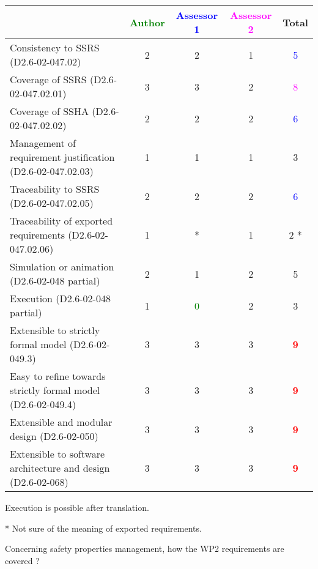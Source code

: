 \begin{tabular}{|l | c | c | c | c|}
\hline
& \textcolor{green}{Author} & \textcolor{blue}{Assessor 1} & \textcolor{magenta}{Assessor 2} & Total \\
\hline 
Consistency to SSRS (D2.6-02-047.02) & 2    & 2    & 1    & \textcolor{blue}{5} \\
\hline
Coverage of SSRS (D2.6-02-047.02.01)  & 3    & 3    & 2    & \textcolor{magenta}{8} \\
\hline
Coverage of SSHA (D2.6-02-047.02.02)  & 2    & 2    & 2    & \textcolor{blue}{6} \\
\hline
Management of requirement justification (D2.6-02-047.02.03)  & 1    & 1    & 1    & 3    \\
\hline
Traceability to  SSRS (D2.6-02-047.02.05)  & 2    & 2    & 2    & \textcolor{blue}{6} \\
\hline
Traceability of exported requirements (D2.6-02-047.02.06)  & 1    & * & 1    & 2   * \\
\hline
Simulation or animation (D2.6-02-048 partial)  & 2    & 1    & 2    &  5 \\
\hline
Execution (D2.6-02-048 partial)  & 1    & \textcolor{green}{0} & 2    & 3    \\
\hline
Extensible to strictly formal model (D2.6-02-049.3) & 3    & 3    & 3    & \textcolor{red}{\textbf{9}}  \\
\hline
Easy to  refine towards strictly formal model (D2.6-02-049.4) & 3    & 3    & 3    & \textcolor{red}{\textbf{9}}  \\
\hline
Extensible and modular design (D2.6-02-050)  & 3    & 3    & 3    & \textcolor{red}{\textbf{9}} \\
\hline
Extensible to software architecture and design (D2.6-02-068)   & 3    & 3    & 3    & \textcolor{red}{\textbf{9}} \\
\hline
\end{tabular}


\begin{author_comment}
Execution is possible after translation.
\end{author_comment}
\begin{assessor1}
* Not sure of the meaning of exported requirements.
\end{assessor1}

Concerning safety properties management, how the WP2 requirements are covered ?

